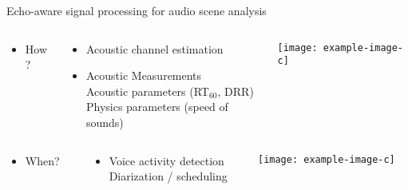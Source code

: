 \begin{frame}[t]{Echo-aware signal processing for \alert{audio scene analysis}}
    \vspace{1em}
    \begin{columns}[T,onlytextwidth]
        \begin{column}{0.15\textwidth}
            \begin{itemize}
                \item How?
            \end{itemize}
        \end{column}
        \begin{column}{0.5\textwidth}
            \begin{itemize}
                \item \alert{Acoustic channel estimation}
                \item Acoustic Measurements
                \\{\small Acoustic parameters (RT$_{60}$, DRR)}
                \\{\small Physics parameters (speed of sounds)}
            \end{itemize}
        \end{column}
        \begin{column}{0.24\textwidth}
                \texttt{[image: example-image-c]}
        \end{column}
    \end{columns}

    \vspace{1em}
    \begin{columns}[T,onlytextwidth]
        \begin{column}{0.15\textwidth}
            \begin{itemize}
                \item When?
            \end{itemize}
        \end{column}
        \begin{column}{0.5\textwidth}
            \begin{itemize}
                \item Voice activity detection
                \\{\small Diarization / scheduling}
            \end{itemize}
        \end{column}
        \begin{column}{0.24\textwidth}
                \texttt{[image: example-image-c]}
            \end{column}
    \end{columns}


\end{frame}
